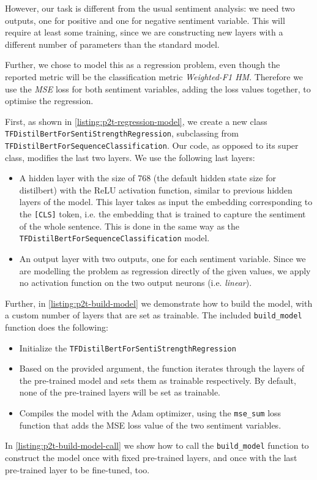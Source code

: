 However, our task is different from the usual sentiment analysis: we need two outputs, one for positive and one for negative sentiment variable. This will require at least some training, since we are constructing new layers with a different number of parameters than the standard model.

Further, we chose to model this as a regression problem, even though the reported metric will be the classification metric \textit{Weighted-F1 HM}. Therefore we use the \textit{MSE} loss for both sentiment variables, adding the loss values together, to optimise the regression.

First, as shown in \cref{listing:p2t-regression-model}, we create a new class \texttt{TFDistilBertForSentiStrengthRegression}, subclassing from \texttt{TFDistilBertForSequenceClassification}. Our code, as opposed to its super class, modifies the last two layers. We use the following last layers:
\begin{itemize}
    \item A hidden layer with the size of 768 (the default hidden state size for distilbert) with the ReLU activation function, similar to previous hidden layers of the model. This layer takes as input the embedding corresponding to the \texttt{[CLS]} token, i.e. the embedding that is trained to capture the sentiment of the whole sentence. This is done in the same way as the \texttt{TFDistilBertForSequenceClassification} model.
    \item An output layer with two outputs, one for each sentiment variable. Since we are modelling the problem as regression directly of the given values, we apply no activation function on the two output neurons (i.e. \textit{linear}).
\end{itemize}

Further, in \cref{listing:p2t-build-model} we demonstrate how to build the model, with a custom number of layers that are set as trainable. The included \texttt{build\_model} function does the following:
\begin{itemize}
    \item Initialize the \texttt{TFDistilBertForSentiStrengthRegression}
    \item Based on the provided argument, the function iterates through the layers of the pre-trained model and sets them as trainable respectively. By default, none of the pre-trained layers will be set as trainable.
    \item Compiles the model with the Adam optimizer, using the \texttt{mse\_sum} loss function that adds the MSE loss value of the two sentiment variables.
\end{itemize}
In \cref{listing:p2t-build-model-call} we show how to call the \texttt{build\_model} function to construct the model once with fixed pre-trained layers, and once with the last pre-trained layer to be fine-tuned, too.

